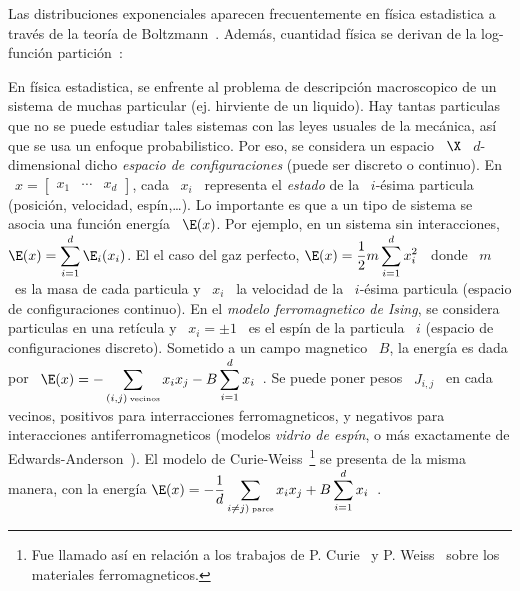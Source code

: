 Las distribuciones exponenciales aparecen frecuentemente en f\'isica estadistica
a  trav\'es de  la teor\'ia  de Boltzmann~\cite{Bol96,  Bol98,  Gib02, LanLif80,
  MezMon09,  Mer10,  Mer18}.  Adem\'as,  cuantidad  f\'isica  se  derivan de  la
log-funci\'on partici\'on~\cite{Max67, Gib02, LanLif80, MezMon09, Mer10, Mer18}:
%
\begin{ejemplo}
  En f\'isica estadistica, se enfrente al problema de descripci\'on macroscopico
  de un sistema  de muchas particular (ej. hirviente de  un liquido). Hay tantas
  particulas que no se puede estudiar tales sistemas con las leyes usuales de la
  mec\'anica, as\'i que se usa  un enfoque probabilistico. Por eso, se considera
  un espacio  \ $\X$  \ $d$-dimensional dicho  {\em espacio  de configuraciones}
  (puede ser  discreto o  continuo). En \  $x =  \begin{bmatrix} x_1 &  \cdots &
    x_d\end{bmatrix}$,  cada  \ $x_i$  \  representa el  {\em  estado}  de la  \
  $i$-\'esima particula (posici\'on,  velocidad, esp\'in,\ldots).  Lo importante
  es que a un  tipo de sistema se asocia una funci\'on  energ\'ia \ $\E(x)$. Por
  ejemplo, en un sistema  sin interacciones, $\displaystyle \E(x) = \sum_{i=1}^d
  \E_i(x_i)$.  El  el caso  del gaz perfecto,  $\displaystyle \E(x) =  \frac12 m
  \sum_{i=1}^d x_i^2$ \ donde  \ $m$ \ es la masa de cada  particula y \ $x_i$ \
  la  velocidad  de  la  \  $i$-\'esima particula  (espacio  de  configuraciones
  continuo).   En  el  {\em   modelo  ferromagnetico  de  Ising},  se  considera
  particulas en una ret\'icula y \ $x_i = \pm 1$ \ es el esp\'in de la particula
  \ $i$ (espacio de configuraciones  discreto).  Sometido a un campo magnetico \
  $B$,  la energ\'ia  es dada  por  \ $\displaystyle  \E(x) =  - \sum_{(i,j)  \:
    \mbox{\tiny  vecinos}} x_i  x_j  - B  \sum_{i=1}^d x_i$~\cite{Len20,  Isi25,
    Ons44, LanLif80, MezMon09, Mer10, Mer18}.   Se puede poner pesos \ $J_{i,j}$
  \ en cada vecinos,  positivos para interracciones ferromagneticos, y negativos
  para  interacciones antiferromagneticos  (modelos {\em  vidrio de  esp\'in}, o
  m\'as  exactamente  de  Edwards-Anderson~\cite{EdwAnd75,  LanLif80,  MezMon09,
    Mer10,  Mer18}).  El  modelo de  Curie-Weiss~\footnote{Fue llamado  as\'i en
    relaci\'on a los trabajos  de P.  Curie~\cite{Cur95} y P. Weiss~\cite{Wei96,
      Wei07}  sobre los materiales  ferromagneticos.}  se  presenta de  la misma
  manera, con la energ\'ia $\displaystyle \E(x) = - \frac{1}{d} \sum_{i\ne j) \:
    \mbox{\tiny  pares}} x_i  x_j +  B \sum_{i=1}^d  x_i$~\cite{MezMon09, Mer10,
    Mer18}.


\end{ejemplo}
